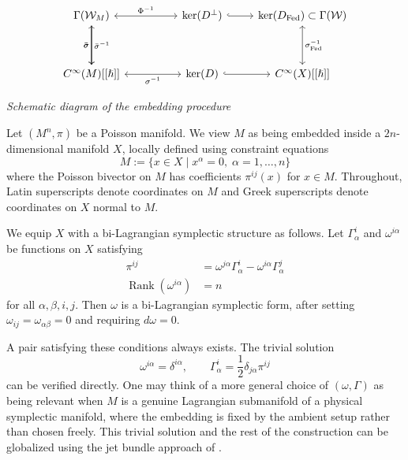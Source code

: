 \documentclass[
  12pt,
  a4paper, oneside
]{report}
\renewcommand{\hbar}{\hslash}
\theoremstyle{bolddef}
\theoremstyle{remark}
\numberwithin{equation}{chapter}
\begin{document}
$$
\begin{tikzcd}
  \Gamma(\mathcal{W}_M)&& \ker(D^\perp)& \ker(D_\mathrm{Fed})\subset \Gamma(\mathcal{W}) \\
   \\
  C^\infty(M)[[\hbar]] && \ker(D) &  C^\infty(X)[[\hbar]]
  \arrow["{\sigma^{-1}}"',leftrightarrow, from=3-1,to=3-3]
	\arrow["{\bar\sigma}^{-1}"',from=3-1, to=1-1]
	\arrow[hook, from=3-3, to=3-4]
	\arrow[hook, from=1-3, to=1-4]
	\arrow["{\sigma_\mathrm{Fed}^{-1}}"',leftrightarrow,from=3-4, to=1-4]
	\arrow["{\bar{\sigma}}"', from=1-1, to=3-1]
	\arrow["{\Phi^{-1}}"',leftrightarrow, from=1-3, to=1-1]
	\arrow["{\bar{\sigma}}"', from=1-1, to=3-1]
\end{tikzcd} $$
\begin{center}
    \textit{Schematic diagram of the embedding procedure}
\end{center}
Let $(M^n, \pi)$ be a Poisson manifold. We view $M$ as being embedded inside a $2n$-dimensional manifold $X$, locally defined using constraint equations
\[
M := \{ x \in X \mid x^\alpha = 0,\; \alpha = 1, \ldots, n \}
\]
where the Poisson bivector on $M$ has coefficients $\pi^{ij}(x)$ for $x \in M$. Throughout, Latin superscripts denote coordinates on $M$ and Greek superscripts denote coordinates on $X$ normal to $M$.

We equip $X$ with a bi-Lagrangian symplectic structure as follows. Let $\Gamma^i_\alpha$ and $\omega^{i\alpha}$ be functions on $X$ satisfying
\begin{align}
\pi^{ij} &= \omega^{j\alpha} \Gamma^i_\alpha - \omega^{i\alpha} \Gamma^j_\alpha \label{eq:pi-decomp} \\
\operatorname{Rank}(\omega^{i\alpha}) &= n \label{eq:rank-cond}
\end{align}
for all $\alpha, \beta, i, j$. Then $\omega$ is a bi-Lagrangian symplectic form, after setting $\omega_{ij} = \omega_{\alpha\beta} = 0$ and requiring $d\omega = 0$.

A pair satisfying these conditions always exists. The trivial solution
\[
\omega^{i\alpha} = \delta^{i\alpha}, \qquad \Gamma^i_\alpha = \frac{1}{2}\delta_{j\alpha} \pi^{ij}
\]
can be verified directly. One may think of a more general choice of $(\omega, \Gamma)$ as being relevant when $M$ is a genuine Lagrangian submanifold of a physical symplectic manifold, where the embedding is fixed by the ambient setup rather than chosen freely. This trivial solution and the rest of the construction can be globalized using the jet bundle approach of \cite{CFT}.
\end{document}
